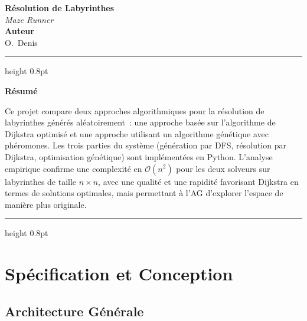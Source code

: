 \documentclass[12pt, a4paper]{article}
\theoremstyle{definition}
\theoremstyle{remark}
\newcommand{\bigO}[1]{\mathcal{O}\!\left(#1\right)}
\begin{document}
\begin{titlepage}
    \centering
    \vspace*{2cm}

    {\Huge\bfseries Résolution de Labyrinthes}\\[0.4em]
    {\Large\itshape Maze Runner}\\[2cm]

    {\large\bfseries Auteur}\\[0.4em]
    {\large O.~Denis}\\[2cm]

    \hrule height 0.8pt
    \vspace{1em}
    {\normalsize
    \textbf{Résumé}\\[0.6em]
    \begin{minipage}{0.88\textwidth}
        Ce projet compare deux approches algorithmiques pour la résolution de labyrinthes
        générés aléatoirement~: une approche basée sur l'algorithme de Dijkstra optimisé
        et une approche utilisant un algorithme génétique avec phéromones.
        Les trois parties du système (génération par DFS, résolution par Dijkstra,
        optimisation génétique) sont implémentées en Python.
        L'analyse empirique confirme une complexité en $\bigO{n^2}$ pour les deux solveurs
        sur labyrinthes de taille $n \times n$, avec une qualité et une rapidité favorisant
        Dijkstra en termes de solutions optimales, mais permettant à l'AG d'explorer
        l'espace de manière plus originale.
    \end{minipage}
    }
    \vspace{1em}
    \hrule height 0.8pt

    \vfill
\end{titlepage}

\tableofcontents
\newpage

\section{Spécification et Conception}

\subsection{Architecture Générale}
\end{document}
